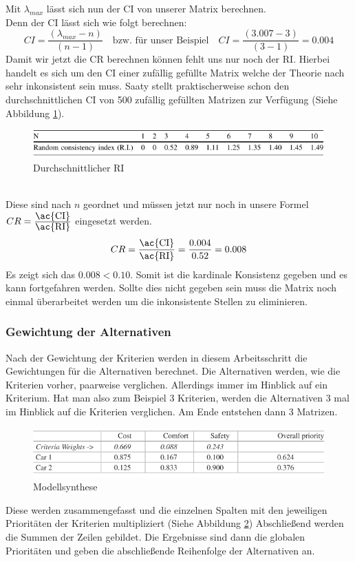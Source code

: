 Mit $\lambda_{max}$ lässt sich nun der \ac{CI} von unserer Matrix berechnen. \\
Denn der \ac{CI} lässt sich wie folgt berechnen:\autocite[Vgl.][S.14]{Mu.2018}
\[CI=\frac{(\lambda_{max}-n)}{(n-1)}\quad \mbox{bzw. für unser Beispiel}\quad CI=\frac{(3.007-3)}{(3-1)}=0.004\]
Damit wir jetzt die \ac{CR} berechnen können fehlt uns nur noch der \ac{RI}. Hierbei handelt es sich um den \ac{CI} einer zufällig gefüllte Matrix welche der Theorie nach sehr inkonsistent sein muss. Saaty stellt praktischerweise schon den durchschnittlichen \ac{CI} von 500 zufällig gefüllten Matrizen zur Verfügung (Siehe Abbildung \ref{img:ri}).\\
\begin{figure}[h!]
	\centering
	\includegraphics[scale = 0.9]{img/RI.png}
	\caption{Durchschnittlicher RI}
	\label{img:ri}
\end{figure}\\
Diese sind nach $n$ geordnet und müssen jetzt nur noch in unsere Formel $CR=\frac{\mbox{\ac{CI}}}{\mbox{\ac{RI}}}$ eingesetzt werden.
\[CR=\frac{\mbox{\ac{CI}}}{\mbox{\ac{RI}}}=\frac{0.004}{0.52}=0.008\]
Es zeigt sich das $0.008<0.10$. Somit ist die kardinale Konsistenz gegeben und es kann fortgefahren werden. Sollte dies nicht gegeben sein muss die Matrix noch einmal überarbeitet werden um die inkonsistente Stellen zu eliminieren.\autocite[Vgl.][S.108]{Fink.2006}
\subsubsection{Gewichtung der Alternativen}
Nach der Gewichtung der Kriterien werden in diesem Arbeitsschritt die Gewichtungen für die Alternativen berechnet. Die Alternativen werden, wie die Kriterien vorher, paarweise verglichen. Allerdings immer im Hinblick auf ein Kriterium. Hat man also zum Beispiel 3 Kriterien, werden die Alternativen 3 mal im Hinblick auf die Kriterien verglichen. Am Ende entstehen dann 3 Matrizen. 
\begin{figure}[h!]
	\centering
	\includegraphics[scale = 0.9]{img/All.png}
	\caption{Modellsynthese}
	\label{img:all}
\end{figure}
Diese werden zusammengefasst und die einzelnen Spalten mit den jeweiligen Prioritäten der Kriterien multipliziert\autocite[Vgl.][S.19]{Mu.2018} (Siehe Abbildung \ref{img:all}) Abschließend werden die Summen der Zeilen gebildet. Die Ergebnisse sind dann die globalen Prioritäten und geben die abschließende Reihenfolge der Alternativen an. 
